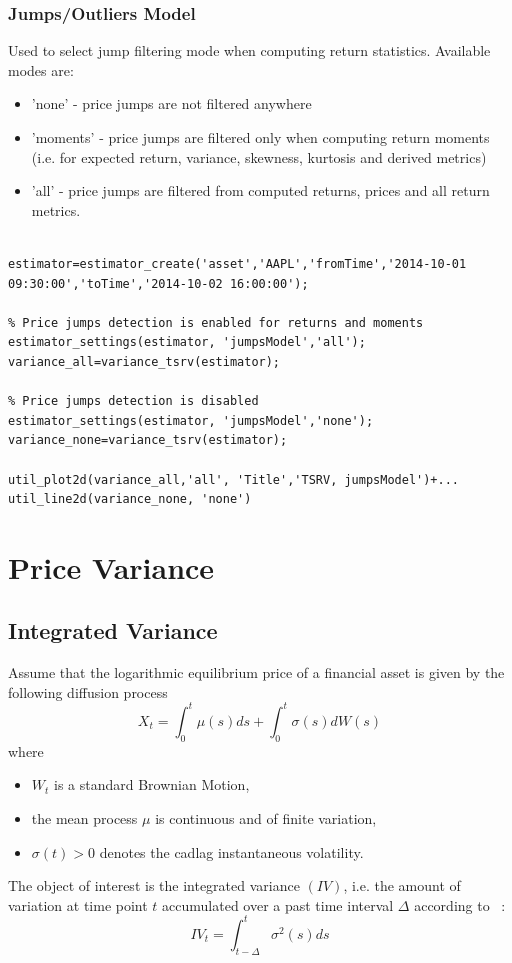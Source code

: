 \documentclass[letterpaper]{report}
\begin{document}
\subsection{Jumps/Outliers Model}
Used to select jump filtering mode when computing return statistics. Available modes are: 
\begin{itemize} 
  \item 'none' - price jumps are not filtered anywhere
  \item 'moments' - price jumps are filtered only when computing return moments
  (i.e. for expected return, variance, skewness, kurtosis and derived
  metrics)
  \item 'all' - price jumps are filtered from computed returns, prices and all
   return metrics.
\end{itemize}
\begin{lstlisting}

estimator=estimator_create('asset','AAPL','fromTime','2014-10-01 09:30:00','toTime','2014-10-02 16:00:00');

% Price jumps detection is enabled for returns and moments
estimator_settings(estimator, 'jumpsModel','all');
variance_all=variance_tsrv(estimator);

% Price jumps detection is disabled
estimator_settings(estimator, 'jumpsModel','none');
variance_none=variance_tsrv(estimator);

util_plot2d(variance_all,'all', 'Title','TSRV, jumpsModel')+...
util_line2d(variance_none, 'none')
\end{lstlisting}


\chapter{Price Variance}
\section{Integrated Variance}
Assume that the logarithmic equilibrium price of a financial asset is given by the following
diffusion process
\begin{equation}
X_t = \int_0^t \mu(s)ds + \int_0^t \sigma(s)dW(s)
\end{equation}
where

\begin{itemize}
\item $W_t$ is a standard Brownian Motion,
\item the mean process $\mu$ is continuous and of finite variation,
\item $\sigma(t) >0$ denotes the cadlag instantaneous volatility.
\end{itemize}
\noindent The object of interest is the integrated variance $(IV)$, i.e. the
amount of variation at time point $t$ accumulated over a past time interval
$\Delta$ according to ~\cite[Pigorsch et al.]{Pigorsch_Pigorsch_Popov}:
\begin{equation}
IV_t = \int_{t-\Delta}^t \sigma^2(s)ds
\end{equation}
\end{document}
